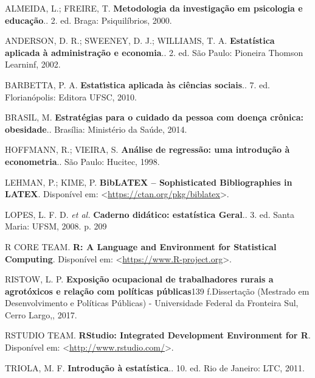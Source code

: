 \documentclass[12pt,brazil,oneside]{book}
\begin{document}
\leavevmode\hypertarget{ref-almeida2000}{}%
ALMEIDA, L.; FREIRE, T. \textbf{Metodologia da investigação em psicologia e educação}.. 2. ed. Braga: Psiquilíbrios, 2000.

\leavevmode\hypertarget{ref-anderson2002}{}%
ANDERSON, D. R.; SWEENEY, D. J.; WILLIAMS, T. A. \textbf{Estatística aplicada à administração e economia}.. 2. ed. São Paulo: Pioneira Thomson Learninf, 2002.

\leavevmode\hypertarget{ref-barbetta1988}{}%
BARBETTA, P. A. \textbf{Estatı́stica aplicada às ciências sociais}.. 7. ed. Florianópolis: Editora UFSC, 2010.

\leavevmode\hypertarget{ref-brasil2014}{}%
BRASIL, M. \textbf{Estratégias para o cuidado da pessoa com doença crônica: obesidade}.. Brasília: Ministério da Saúde, 2014.

\leavevmode\hypertarget{ref-hoffmann1998}{}%
HOFFMANN, R.; VIEIRA, S. \textbf{Análise de regressão: uma introdução à econometria}.. São Paulo: Hucitec, 1998.

\leavevmode\hypertarget{ref-biblatex}{}%
LEHMAN, P.; KIME, P. \textbf{BibLATEX -- Sophisticated Bibliographies in LATEX}. Disponível em: \textless{}\url{https://ctan.org/pkg/biblatex}\textgreater{}.

\leavevmode\hypertarget{ref-lopes2008}{}%
LOPES, L. F. D. \emph{et al.} \textbf{Caderno didático: estatística Geral}.. 3. ed. Santa Maria: UFSM, 2008. p. 209

\leavevmode\hypertarget{ref-rcore}{}%
R CORE TEAM. \textbf{R: A Language and Environment for Statistical Computing}. Disponível em: \textless{}\url{https://www.R-project.org}\textgreater{}.

\leavevmode\hypertarget{ref-Ristow2017}{}%
RISTOW, L. P. \textbf{Exposição ocupacional de trabalhadores rurais a agrotóxicos e relação com políticas públicas}139 f.Dissertação (Mestrado em Desenvolvimento e Políticas Públicas) - Universidade Federal da Fronteira Sul, Cerro Largo,, 2017.

\leavevmode\hypertarget{ref-teamrstudio}{}%
RSTUDIO TEAM. \textbf{RStudio: Integrated Development Environment for R}. Disponível em: \textless{}\url{http://www.rstudio.com/}\textgreater{}.

\leavevmode\hypertarget{ref-triola1999}{}%
TRIOLA, M. F. \textbf{Introdução à estatística}.. 10. ed. Rio de Janeiro: LTC, 2011.
\end{document}

